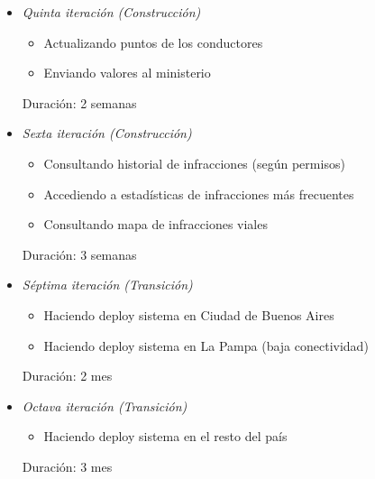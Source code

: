 \begin{itemize}
\item \textit{Quinta iteración (Construcción)}
\begin{itemize}
\item Actualizando puntos de los conductores 
\item Enviando valores al ministerio 
\end{itemize}

Duración: 2 semanas

\item \textit{Sexta iteración (Construcción)}
\begin{itemize}
\item Consultando historial de infracciones (según permisos) 
\item Accediendo a estadísticas de infracciones más frecuentes 
\item Consultando mapa de infracciones viales 
\end{itemize}

Duración: 3 semanas

\item \textit{Séptima iteración (Transición)}
\begin{itemize}
\item Haciendo deploy sistema en Ciudad de Buenos Aires 
\item Haciendo deploy sistema en La Pampa (baja conectividad) 
\end{itemize}

Duración: 2 mes

\item \textit{Octava iteración (Transición)}
\begin{itemize}
\item Haciendo deploy sistema en el resto del país
\end{itemize}

Duración: 3 mes

\end{itemize}